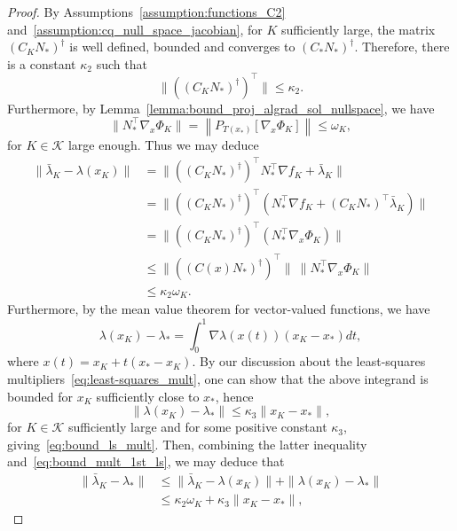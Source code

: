\documentclass{article}
\numberwithin{equation}{section}
\newcommand{\calK}{{\mathcal{K}}}
\newcommand{\proj}[2]{P_{#1} \left[ {#2} \right]} %
\theoremstyle{plain}
\begin{document}
	\begin{proof}
		By Assumptions~\ref{assumption:functions_C2} and~\ref{assumption:cq_null_space_jacobian}, for $K$ sufficiently large, the matrix $\left(C_KN_*\right)^\dagger$ is well defined, bounded and converges to $\left(C_*N_*\right)^\dagger$. Therefore, there is a constant $\kappa_2$ such that
		\begin{equation*}
			\|(\left(C_KN_*\right)^\dagger)^\top \| \le \kappa_2.
		\end{equation*}
		Furthermore, by Lemma~\ref{lemma:bound_proj_algrad_sol_nullspace}, we have
		\[ \|N_*^\top \nabla_x\Phi_K\| = \left\| \proj{T(x_*)}{\nabla_x \Phi_K} \right\| \le  \omega_K,\]
		for $K \in \calK$ large enough. Thus we may deduce
		\begin{equation}\label{eq:bound_mult_1st_ls}
			\begin{split}
				\|\bar \lambda_K - \lambda(x_K) \| & = \|(\left(C_KN_*\right)^\dagger)^\top N_*^\top\nabla f_K + \bar\lambda_K\| \\
				& = \|(\left(C_KN_*\right)^\dagger)^\top (N_*^\top\nabla f_K + (C_KN_*)^\top\bar\lambda_K)\| \\
				& = \|((C_KN_*)^\dagger)^\top (N_*^\top  \nabla_x \Phi_K)\| \\
				& \le 	\|(\left(C(x)N_*\right)^\dagger)^\top \| \ \|N_*^\top \nabla_x\Phi_K\| \\
				& \le \kappa_2 \omega_K.
			\end{split}
		\end{equation}
		Furthermore, by the mean value theorem for vector-valued functions, we have
		\[\lambda(x_K) - \lambda_* = \int_{0}^{1} \nabla \lambda(x(t))(x_K-x_*)dt,\]
		where $x(t) = x_K + t(x_*-x_K)$. By our discussion about the least-squares multipliers~\eqref{eq:least-squares_mult}, one can show that the above integrand is bounded for $x_K$ sufficiently close to $x_*$, hence
		\[\| \lambda(x_K) - \lambda_*\| \le \kappa_3 \|x_K-x_*\|,\]
		for $K\in \calK$ sufficiently large and for some positive constant $\kappa_3$, giving~\eqref{eq:bound_ls_mult}.
		Then, combining the latter inequality and~\eqref{eq:bound_mult_1st_ls}, we may deduce that
		\begin{equation*}
			\begin{split}
				\|\bar \lambda_K - \lambda_* \| & \le \|\bar \lambda_K - \lambda(x_K) \| + \|\lambda(x_K) - \lambda_* \| \\
				& \le \kappa_2 \omega_K + \kappa_3 \|x_K-x_*\|,
			\end{split}
		\end{equation*}

\end{proof}
\end{document}

